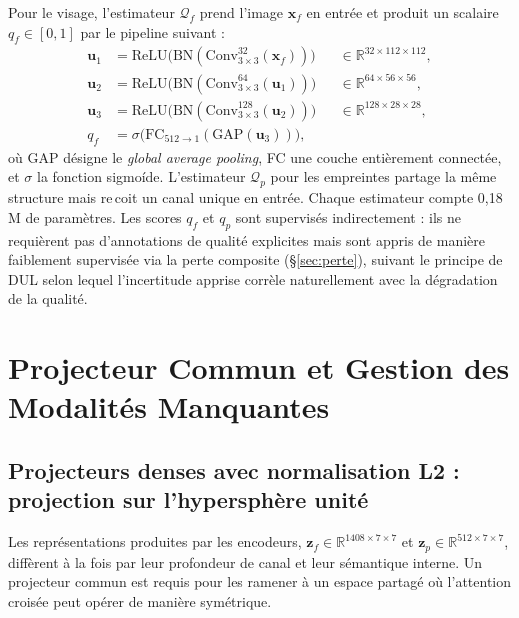 \documentclass[12pt,a4paper]{report}
\begin{document}
Pour le visage, l'estimateur $\mathcal{Q}_f$ prend l'image $\mathbf{x}_f$ en entr\'{e}e et produit un scalaire $q_f \in [0, 1]$ par le pipeline suivant :
\begin{align}
\mathbf{u}_1 &= \text{ReLU}\bigl(\text{BN}(\text{Conv}_{3 \times 3}^{32}(\mathbf{x}_f))\bigr) &&\in \mathbb{R}^{32 \times 112 \times 112}, \\
\mathbf{u}_2 &= \text{ReLU}\bigl(\text{BN}(\text{Conv}_{3 \times 3}^{64}(\mathbf{u}_1))\bigr) &&\in \mathbb{R}^{64 \times 56 \times 56}, \\
\mathbf{u}_3 &= \text{ReLU}\bigl(\text{BN}(\text{Conv}_{3 \times 3}^{128}(\mathbf{u}_2))\bigr) &&\in \mathbb{R}^{128 \times 28 \times 28}, \\
q_f &= \sigma\bigl(\text{FC}_{512 \rightarrow 1}(\text{GAP}(\mathbf{u}_3))\bigr),
\end{align}
o\`{u} GAP d\'{e}signe le \emph{global average pooling}, FC une couche enti\`{e}rement connect\'{e}e, et $\sigma$ la fonction sigmo\'{i}de. L'estimateur $\mathcal{Q}_p$ pour les empreintes partage la m\^{e}me structure mais re\,{c}oit un canal unique en entr\'{e}e. Chaque estimateur compte 0,18 M de param\`{e}tres. Les scores $q_f$ et $q_p$ sont supervis\'{e}s indirectement : ils ne requi\`{e}rent pas d'annotations de qualit\'{e} explicites mais sont appris de mani\`{e}re faiblement supervis\'{e}e via la perte composite (\S\ref{sec:perte}), suivant le principe de DUL \cite{chang2020data} selon lequel l'incertitude apprise corr\`{e}le naturellement avec la d\'{e}gradation de la qualit\'{e}.

\section{Projecteur Commun et Gestion des Modalit\'{e}s Manquantes}
\label{sec:projecteurs}

\subsection{Projecteurs denses avec normalisation L2 : projection sur l'hypersph\`{e}re unit\'{e}}

Les repr\'{e}sentations produites par les encodeurs, $\mathbf{z}_f \in \mathbb{R}^{1408 \times 7 \times 7}$ et $\mathbf{z}_p \in \mathbb{R}^{512 \times 7 \times 7}$, diff\`{e}rent \`{a} la fois par leur profondeur de canal et leur s\'{e}mantique interne. Un projecteur commun est requis pour les ramener \`{a} un espace partag\'{e} o\`{u} l'attention crois\'{e}e peut op\'{e}rer de mani\`{e}re sym\'{e}trique.
\end{document}
